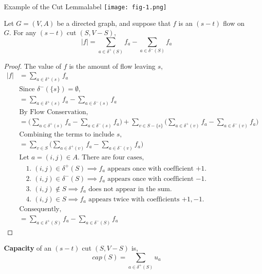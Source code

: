 	\begin{ex}{Example of the Cut Lemma}{label}
		\texttt{[image: fig-1.png]}
	\end{ex}

	\begin{lem}
		Let $G = (V,A)$ be a directed graph, and suppose that $f$ is an $(s-t)$ flow on $G$. For any $(s-t)$ cut $(S, V - S)$,
		\[|f| = \sum_{a \in \delta^+(S)} f_a - \sum_{a \in \delta^-(S)} f_a\]
	\end{lem}

	\begin{proof}
		The value of $f$ is the amount of flow leaving $s$,
		\begin{align*}
			|f| &= \sum_{a \in \delta^+(s)} f_a \\
					& \text{Since $\delta^-(\{s\}) = \emptyset$,} \\
					&= \sum_{a \in \delta^+(s)} f_a - \sum_{a \in \delta^-(s)} f_a \\
					& \text{By Flow Conservation,} \\
					&= \big(\sum_{a \in \delta^+(s)} f_a - \sum_{a \in \delta^-(s)} f_a \big) + \sum_{v \in S - \{s\}}\big(\sum_{a \in \delta^+(v)} f_a - \sum_{a \in \delta^-(v)} f_a\big) \\
					& \text{Combining the terms to include $s$,} \\
					&= \sum_{v \in S} \big( \sum_{a \in \delta^+(v)} f_a - \sum_{a \in \delta^-(v)} f_a \big) \\
					& \text{Let $a = (i,j) \in A$. There are four cases,}\\
					& \quad \text{1. $(i,j) \in \delta^+(S) \implies f_a$ appears once with coefficient $+1$.} \\ 
					& \quad \text{2. $(i,j) \in \delta^-(S) \implies f_a$ appears once with coefficient $-1$.} \\ 
					& \quad \text{3. $(i,j) \not\in S \implies f_a$ does not appear in the sum.} \\ 
					& \quad \text{4. $(i,j) \in S \implies f_a$ appears twice with coefficients $+1, -1$.} \\ 
					& \text{Consequently,} \\
					&= \sum_{a \in \delta^+(S)} f_a - \sum_{a \in \delta^-(S)} f_a
		\end{align*}
	\end{proof}
		
	\begin{defn}
		\textbf{Capacity} of an $(s-t)$ cut $(S, V - S)$ is,
		\[cap(S) = \sum_{a \in \delta^+(S)} u_a\]
	\end{defn}


